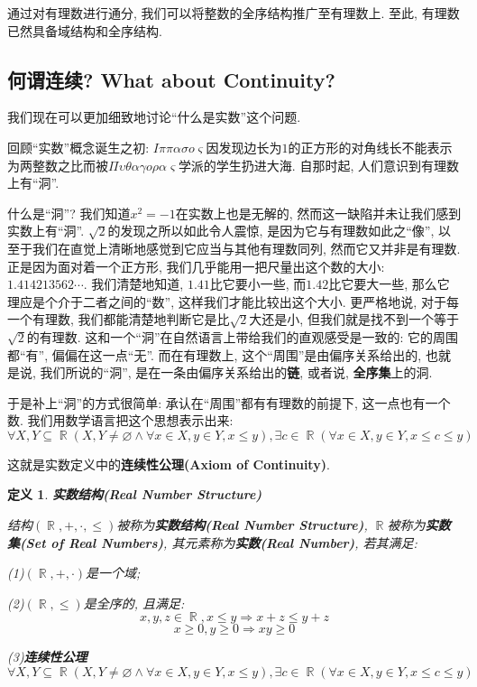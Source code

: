 \documentclass[UTF8]{ctexart}
\newcommand{\<}{\langle}
\renewcommand{\>}{\rangle}
\DeclareMathOperator{\R}{\mathbb{R}}
\newtheorem{dfn}[thm]{定义}
\begin{document}
            通过对有理数进行通分, 我们可以将整数的全序结构推广至有理数上. 至此, 有理数已然具备域结构和全序结构. 

        \subsection{何谓连续? What about Continuity? }

            我们现在可以更加细致地讨论``什么是实数''这个问题. 

            回顾``实数''概念诞生之初: $I\pi\pi\alpha\sigma o\varsigma$因发现边长为$1$的正方形的对角线长不能表示为两整数之比而被$\varPi \upsilon\theta\alpha\gamma o\rho\alpha\varsigma$学派的学生扔进大海. 自那时起, 人们意识到有理数上有``洞''. 

            什么是``洞''? 我们知道$x^2=-1$在实数上也是无解的, 然而这一缺陷并未让我们感到实数上有``洞''. $\sqrt{2}$的发现之所以如此令人震惊, 是因为它与有理数如此之``像'', 以至于我们在直觉上清晰地感觉到它应当与其他有理数同列, 然而它又并非是有理数. 正是因为面对着一个正方形, 我们几乎能用一把尺量出这个数的大小: $1.414213562\cdots$. 我们清楚地知道, $1.41$比它要小一些, 而$1.42$比它要大一些, 那么它理应是个介于二者之间的``数'', 这样我们才能比较出这个大小. 更严格地说, 对于每一个有理数, 我们都能清楚地判断它是比$\sqrt{2}$大还是小, 但我们就是找不到一个等于$\sqrt{2}$的有理数. 这和一个``洞''在自然语言上带给我们的直观感受是一致的: 它的周围都``有'', 偏偏在这一点``无''. 而在有理数上, 这个``周围''是由偏序关系给出的, 也就是说, 我们所说的``洞'', 是在一条由偏序关系给出的\textbf{链}, 或者说, \textbf{全序集}上的洞. 

            于是补上``洞''的方式很简单: 承认在``周围''都有有理数的前提下, 这一点也有一个数. 我们用数学语言把这个思想表示出来: 
            \[\forall X,Y\subseteq\R(X,Y\neq\varnothing\wedge\forall x\in X, y\in Y, x\leq y), \exists c\in\R(\forall x\in X, y\in Y, x\leq c\leq y)\]

            这就是实数定义中的\textbf{连续性公理(Axiom of Continuity)}. 

            \begin{dfn}
                \textbf{实数结构(Real Number Structure)}

                结构$(\R,+,\cdot,\leq)$被称为\textbf{实数结构(Real Number Structure)}, $\R$被称为\textbf{实数集(Set of Real Numbers)}, 其元素称为\textbf{实数(Real Number)}, 若其满足: 

                (1)$(\R,+,\cdot)$是一个域; 

                (2)$(\R,\leq)$是全序的, 且满足: 
                \[x,y,z\in\R, x\leq y\Longrightarrow x+z\leq y+z\]
                \[x\geq 0, y\geq 0\Longrightarrow xy\geq 0\]

                (3)\textbf{连续性公理}
                \[\forall X,Y\subseteq\R(X,Y\neq\varnothing\wedge\forall x\in X, y\in Y, x\leq y), \exists c\in\R(\forall x\in X, y\in Y, x\leq c\leq y)\]
            \end{dfn}
        
\end{document}
